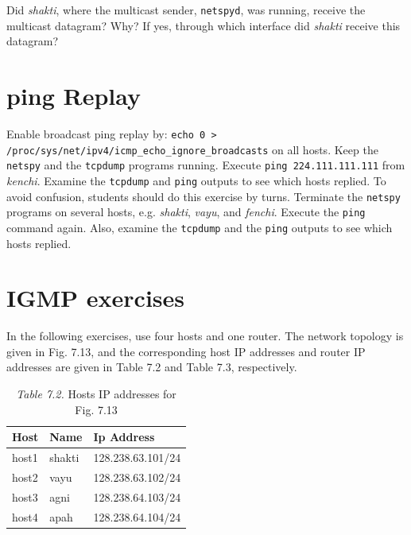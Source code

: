 \documentclass{../UTNetLab}
\begin{document}
    Did \textit{shakti}, where the multicast sender, \lstinline{netspyd}, was running, receive the multicast datagram?
    Why?
    If yes, through which interface did \textit{shakti} receive this datagram?

\section{ping Replay}
    Enable broadcast ping replay by: \lstinline{echo 0 > /proc/sys/net/ipv4/icmp_echo_ignore_broadcasts} on all hosts.
    Keep the \lstinline{netspy} and the \lstinline{tcpdump} programs running.
    Execute \lstinline{ping 224.111.111.111} from \textit{kenchi}.
    Examine the \lstinline{tcpdump} and \lstinline{ping} outputs to see which hosts replied.
    To avoid confusion, students should do this exercise by turns.
    Terminate the \lstinline{netspy} programs on several hosts, e.g. \textit{shakti}, \textit{vayu}, and \textit{fenchi}.
    Execute the \lstinline{ping} command again.
    Also, examine the \lstinline{tcpdump} and the \lstinline{ping} outputs to see which hosts replied.

\section*{IGMP exercises}
    In the following exercises, use four hosts and one router. The network topology is given in Fig. 7.13, and the corresponding host IP addresses and router IP addresses are given in Table 7.2 and Table 7.3, respectively.

    \begin{table}[H]
		\caption{\textit{Table 7.2.} Hosts IP addresses for Fig. 7.13}
		\label{tbl:7.2}
        \vspace{5pt}
        \centering
        \large
        \begin{tabular}{ *3l }
            \hline \hline
            Host & Name & Ip Address \\
            \hline
                host1 & shakti & 128.238.63.101/24 \\
                host2 & vayu   & 128.238.63.102/24 \\
                host3 & agni   & 128.238.64.103/24 \\
                host4 & apah   & 128.238.64.104/24 \\
            \hline \hline
            \end{tabular}
    \end{table}
\end{document}
